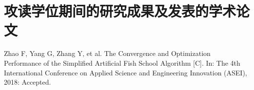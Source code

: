 \chapter{攻读学位期间的研究成果及发表的学术论文}
\begin{publications}
\item Zhao F, Yang G, Zhang Y, et al. The Convergence and Optimization Performance of the Simplified Artificial Fish School Algorithm [C]. In: The 4th International Conference on Applied Science and Engineering Innovation (ASEI), 2018: Accepted.
\end{publications}